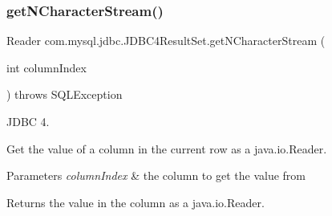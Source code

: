 \subsubsection{\texorpdfstring{get\+N\+Character\+Stream()}{getNCharacterStream()}\hspace{0.1cm}{\footnotesize\ttfamily [1/2]}}
{\footnotesize\ttfamily Reader com.\+mysql.\+jdbc.\+J\+D\+B\+C4\+Result\+Set.\+get\+N\+Character\+Stream (\begin{DoxyParamCaption}\item[{int}]{column\+Index }\end{DoxyParamCaption}) throws S\+Q\+L\+Exception}

J\+D\+BC 4.

Get the value of a column in the current row as a java.\+io.\+Reader. 


\begin{DoxyParams}{Parameters}
{\em column\+Index} & the column to get the value from\\
\hline
\end{DoxyParams}
\begin{DoxyReturn}{Returns}
the value in the column as a java.\+io.\+Reader.
\end{DoxyReturn}

